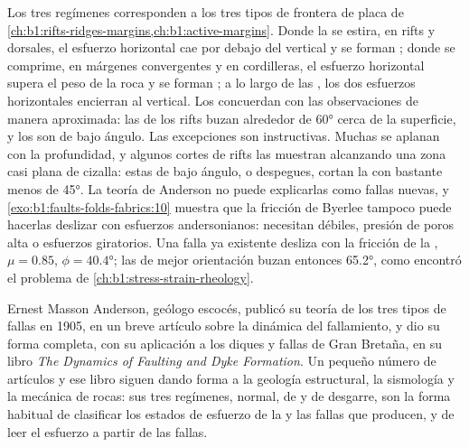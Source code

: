 Los tres regímenes corresponden a los tres tipos de frontera de placa de
\cref{ch:b1:rifts-ridges-margins,ch:b1:active-margins}. Donde la  se estira, en rifts y dorsales, el esfuerzo
horizontal cae por debajo del vertical y se forman ; donde se comprime, en márgenes convergentes y en cordilleras,
el esfuerzo horizontal supera el peso de la roca y se forman ; a lo largo de las , los dos
esfuerzos horizontales encierran al vertical. Los  concuerdan con las observaciones de manera aproximada: las  de los rifts buzan alrededor de \ang{60} cerca de la superficie, y los  son  de bajo
ángulo. Las excepciones son instructivas. Muchas  se aplanan con la profundidad, y algunos cortes de rifts las
muestran alcanzando una zona casi plana de cizalla: estas  de bajo ángulo, o despegues, cortan la  con
bastante menos de \ang{45}. La teoría de Anderson no puede explicarlas como fallas nuevas, y \cref{exo:b1:faults-folds-fabrics:10}
muestra que la fricción de Byerlee tampoco puede hacerlas deslizar con esfuerzos andersonianos: necesitan 
débiles, presión de poros alta o esfuerzos giratorios. Una falla ya existente desliza con la fricción de la ,
$\mu = 0.85$, $\phi = \ang{40.4}$; las  de mejor orientación buzan entonces \ang{65.2}, como encontró el problema
de \cref{ch:b1:stress-strain-rheology}.

\begin{history}
Ernest Masson Anderson, geólogo escocés, publicó su teoría de los tres tipos de fallas en 1905, en un breve artículo sobre la
dinámica del fallamiento, y dio su forma completa, con su aplicación a los diques y fallas de Gran Bretaña, en su libro
\emph{The Dynamics of Faulting and Dyke Formation}. Un pequeño número de artículos y ese libro siguen dando forma a la geología
estructural, la sismología y la mecánica de rocas: sus tres regímenes, normal, de  y de desgarre, son la forma
habitual de clasificar los estados de esfuerzo de la  y las fallas que producen, y de leer el esfuerzo a partir de las fallas.
\end{history}

